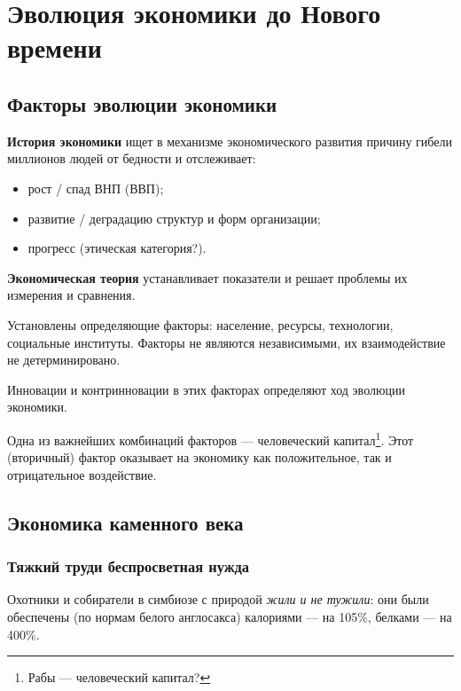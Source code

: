 
%
\section[Эволюция экономики до Нового времени]{Эволюция
экономики до Нового времени }
\subsection[Факторы эволюции экономики]{Факторы эволюции экономики}
\textbf{История экономики} ищет в механизме экономического развития причину гибели миллионов людей от бедности и
отслеживает:

\begin{itemize}
\item рост / спад ВНП (ВВП);
\item развитие / деградацию структур и форм организации;
\item прогресс (этическая категория?).
\end{itemize}

\textbf{Экономическая теория} устанавливает показатели и решает проблемы их измерения и сравнения.

Установлены определяющие факторы: население, ресурсы, технологии, социальные институты. Факторы не являются
независимыми, их взаимодействие не детерминировано.

Инновации и контринновации в этих факторах определяют ход эволюции экономики.

Одна из важнейших комбинаций факторов — человеческий капитал\footnote{Рабы — человеческий капитал?}.
Этот (вторичный) фактор оказывает на экономику как положительное, так и отрицательное воздействие.

\subsection[Экономика каменного века]{Экономика каменного века}
\subsubsection[\flqq Тяжкий труд\frqq и \flqq беспросветная нужда\frqq]{\flqq Тяжкий труд\frqq и \flqq беспросветная нужда\frqq}
Охотники и собиратели в симбиозе с природой \textit{жили и не тужили}: они были обеспечены (по нормам белого англосакса)
калориями — на 105\%, белками — на 400\%.

